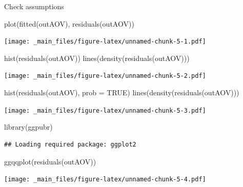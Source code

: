 \documentclass[
]{book}
\newenvironment{Shaded}{\begin{snugshade}}{\end{snugshade}}
\newcommand{\AttributeTok}[1]{\textcolor[rgb]{0.77,0.63,0.00}{#1}}
\newcommand{\ConstantTok}[1]{\textcolor[rgb]{0.00,0.00,0.00}{#1}}
\newcommand{\FunctionTok}[1]{\textcolor[rgb]{0.00,0.00,0.00}{#1}}
\newcommand{\NormalTok}[1]{#1}
\begin{document}
Check assumptions

\begin{Shaded}
\begin{Highlighting}[]
\FunctionTok{plot}\NormalTok{(}\FunctionTok{fitted}\NormalTok{(outAOV), }\FunctionTok{residuals}\NormalTok{(outAOV))}
\end{Highlighting}
\end{Shaded}

\texttt{[image: \_main\_files/figure-latex/unnamed-chunk-5-1.pdf]}

\begin{Shaded}
\begin{Highlighting}[]
\FunctionTok{hist}\NormalTok{(}\FunctionTok{residuals}\NormalTok{(outAOV))}
\FunctionTok{lines}\NormalTok{(}\FunctionTok{density}\NormalTok{(}\FunctionTok{residuals}\NormalTok{(outAOV)))}
\end{Highlighting}
\end{Shaded}

\texttt{[image: \_main\_files/figure-latex/unnamed-chunk-5-2.pdf]}

\begin{Shaded}
\begin{Highlighting}[]
\FunctionTok{hist}\NormalTok{(}\FunctionTok{residuals}\NormalTok{(outAOV), }\AttributeTok{prob =} \ConstantTok{TRUE}\NormalTok{)}
\FunctionTok{lines}\NormalTok{(}\FunctionTok{density}\NormalTok{(}\FunctionTok{residuals}\NormalTok{(outAOV)))}
\end{Highlighting}
\end{Shaded}

\texttt{[image: \_main\_files/figure-latex/unnamed-chunk-5-3.pdf]}

\begin{Shaded}
\begin{Highlighting}[]
\FunctionTok{library}\NormalTok{(ggpubr)}
\end{Highlighting}
\end{Shaded}

\begin{verbatim}
## Loading required package: ggplot2
\end{verbatim}

\begin{Shaded}
\begin{Highlighting}[]
\FunctionTok{ggqqplot}\NormalTok{(}\FunctionTok{residuals}\NormalTok{(outAOV))}
\end{Highlighting}
\end{Shaded}

\texttt{[image: \_main\_files/figure-latex/unnamed-chunk-5-4.pdf]}
\end{document}
